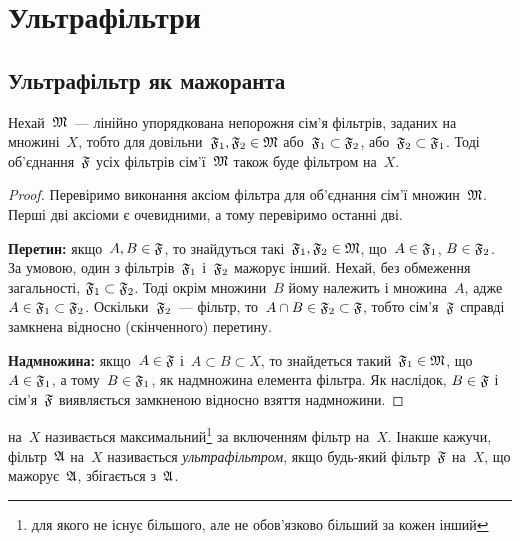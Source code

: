 \chapter{Ультрафільтри}

\section{Ультрафільтр як мажоранта} %

\begin{lemma}
    \label{lem:linear-filter-set-upper-bound}
    Нехай~$\frak M$~--- лінійно упорядкована непорожня сім'я фільтрів, заданих на множині~$X$, тобто для довільни~$\frak F_1, \frak F_2 \in \frak M$ або~$\frak F_1 \subset \frak F_2$, або~$\frak F_2 \subset \frak F_1$.  Тоді об'єднання~$\frak F$ усіх фільтрів сім'ї~$\frak M$ також буде фільтром на~$X$.
\end{lemma}
\begin{proof}
    Перевіримо виконання аксіом фільтра для об'єднання сім'ї множин~$\frak M$. Перші дві аксіоми є очевидними, а тому перевіримо останні дві. 
    
    \textbf{Перетин:} якщо~$A, B \in \frak F$, то знайдуться такі~$\frak F_1, \frak F_2 \in \frak M$, що~$A \in \frak F_1$, $B \in \frak F_2$. За умовою, один з фільтрів~$\frak F_1$ і~$\frak F_2$ мажорує інший. Нехай, без обмеження загальності, $\frak F_1 \subset \frak F_2$.  Тоді окрім множини~$B$ йому належить і множина~$A$, адже~$A \in \frak F_1 \subset \frak F_2$. Оскільки~$\frak F_2$~--- фільтр, то~$A \cap B \in \frak F_2 \subset \frak F$, тобто сім'я~$\frak F$ справді замкнена відносно (скінченного) перетину. 
    
    \textbf{Надмножина:} якщо~$A \in \frak F$ і~$A \subset B \subset X$, то знайдеться такий~$\frak F_1 \in \frak M$, що~$A \in \frak F_1$, а тому~$B \in \frak F_1$, як надмножина елемента фільтра.  Як наслідок, $B \in \frak F$ і сім'я~$\frak F$ виявляється замкненою відносно взяття надмножини.
\end{proof}

\begin{definition}
     на~$X$ називається максимальний\footnote{для якого не існує більшого, але не обов'язково більший за кожен інший} за включенням фільтр на~$X$.  Інакше кажучи, фільтр~$\frak A$ на~$X$ називається \emph{ультрафільтром}, якщо будь-який фільтр~$\frak F$ на~$X$, що мажорує~$\frak A$, збігається з~$\frak A$.
\end{definition}

